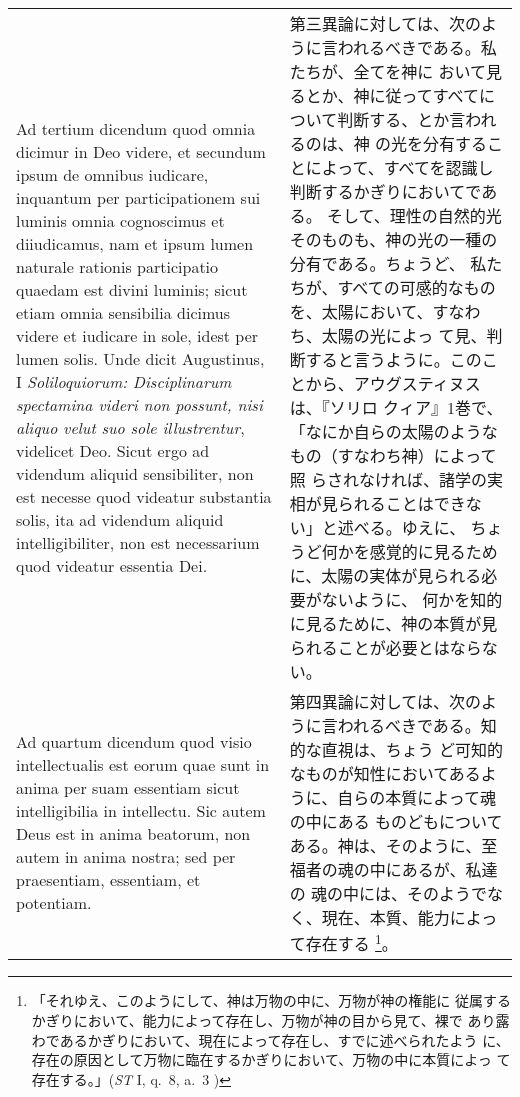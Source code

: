 \documentclass[10pt]{jsarticle} %
\begin{document}
\begin{longtable}{p{21em}p{21em}}
\\

{\sc Ad tertium dicendum} quod omnia dicimur in Deo videre, et
secundum ipsum de omnibus iudicare, inquantum per participationem sui
luminis omnia cognoscimus et diiudicamus, nam et ipsum lumen naturale
rationis participatio quaedam est divini luminis; sicut etiam omnia
sensibilia dicimus videre et iudicare in sole, idest per lumen
solis. Unde dicit Augustinus, I {\it Soliloquiorum: Disciplinarum
spectamina videri non possunt, nisi aliquo velut suo sole
illustrentur}, videlicet Deo. Sicut ergo ad videndum aliquid
sensibiliter, non est necesse quod videatur substantia solis, ita ad
videndum aliquid intelligibiliter, non est necessarium quod videatur
essentia Dei.


&

第三異論に対しては、次のように言われるべきである。私たちが、全てを神に
おいて見るとか、神に従ってすべてについて判断する、とか言われるのは、神
の光を分有することによって、すべてを認識し判断するかぎりにおいてである。
そして、理性の自然的光そのものも、神の光の一種の分有である。ちょうど、
私たちが、すべての可感的なものを、太陽において、すなわち、太陽の光によっ
て見、判断すると言うように。このことから、アウグスティヌスは、『ソリロ
クィア』1巻で、「なにか自らの太陽のようなもの（すなわち神）によって照
らされなければ、諸学の実相が見られることはできない」と述べる。ゆえに、
ちょうど何かを感覚的に見るために、太陽の実体が見られる必要がないように、
何かを知的に見るために、神の本質が見られることが必要とはならない。

\\




{\sc Ad quartum dicendum} quod visio intellectualis est eorum quae
sunt in anima per suam essentiam sicut intelligibilia in
intellectu. Sic autem Deus est in anima beatorum, non autem in anima
nostra; sed per praesentiam, essentiam, et potentiam.


&

第四異論に対しては、次のように言われるべきである。知的な直視は、ちょう
ど可知的なものが知性においてあるように、自らの本質によって魂の中にある
ものどもについてある。神は、そのように、至福者の魂の中にあるが、私達の
魂の中には、そのようでなく、現在、本質、能力によって存在する
\footnote{「それゆえ、このようにして、神は万物の中に、万物が神の権能に
従属するかぎりにおいて、能力によって存在し、万物が神の目から見て、裸で
あり露わであるかぎりにおいて、現在によって存在し、すでに述べられたよう
に、存在の原因として万物に臨在するかぎりにおいて、万物の中に本質によっ
て存在する。」({\it ST} I, q.~8, a.~3 )}。


\end{longtable}
\end{document}
